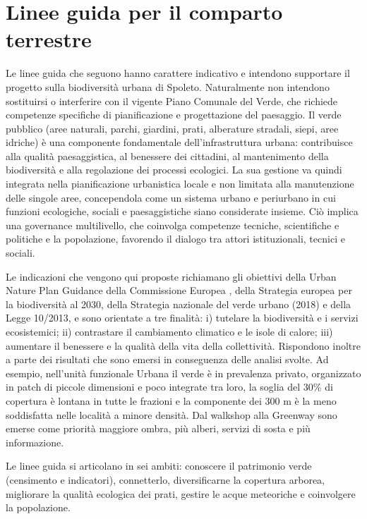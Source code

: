 \documentclass[
  a4paper,
]{book}
\begin{document}
\section{Linee guida per il comparto terrestre}\label{linee-guida-per-il-comparto-terrestre}

Le linee guida che seguono hanno carattere indicativo e intendono supportare il progetto sulla biodiversità urbana di Spoleto.
Naturalmente non intendono sostituirsi o interferire con il vigente Piano Comunale del Verde, che richiede competenze specifiche di pianificazione e progettazione del paesaggio.
Il verde pubblico (aree naturali, parchi, giardini, prati, alberature stradali, siepi, aree idriche) è una componente fondamentale dell'infrastruttura urbana: contribuisce alla qualità paesaggistica, al benessere dei cittadini, al mantenimento della biodiversità e alla regolazione dei processi ecologici.
La sua gestione va quindi integrata nella pianificazione urbanistica locale e non limitata alla manutenzione delle singole aree, concependola come un sistema urbano e periurbano in cui funzioni ecologiche, sociali e paesaggistiche siano considerate insieme.
Ciò implica una governance multilivello, che coinvolga competenze tecniche, scientifiche e politiche e la popolazione, favorendo il dialogo tra attori istituzionali, tecnici e sociali.

Le indicazioni che vengono qui proposte richiamano gli obiettivi della Urban Nature Plan Guidance della Commissione Europea \citep{urbanna2024}, della Strategia europea per la biodiversità al 2030, della Strategia nazionale del verde urbano (2018) e della Legge 10/2013, e sono orientate a tre finalità: i) tutelare la biodiversità e i servizi ecosistemici; ii) contrastare il cambiamento climatico e le isole di calore; iii) aumentare il benessere e la qualità della vita della collettività.
Rispondono inoltre a parte dei risultati che sono emersi in conseguenza delle analisi svolte.
Ad esempio, nell'unità funzionale Urbana il verde è in prevalenza privato, organizzato in patch di piccole dimensioni e poco integrate tra loro, la soglia del 30\% di copertura è lontana in tutte le frazioni e la componente dei 300 m è la meno soddisfatta nelle località a minore densità.
Dal walkshop alla Greenway sono emerse come priorità maggiore ombra, più alberi, servizi di sosta e più informazione.

Le linee guida si articolano in sei ambiti: conoscere il patrimonio verde (censimento e indicatori), connetterlo, diversificarne la copertura arborea, migliorare la qualità ecologica dei prati, gestire le acque meteoriche e coinvolgere la popolazione.
\end{document}
